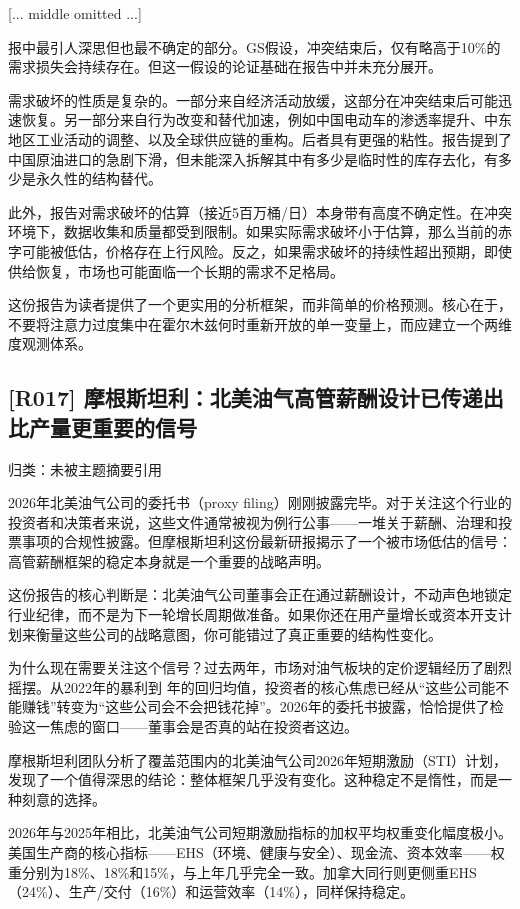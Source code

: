 \documentclass[11pt]{ctexart}
\begin{document}
[... middle omitted ...]

报中最引人深思但也最不确定的部分。GS假设，冲突结束后，仅有略高于10\%的需求损失会持续存在。但这一假设的论证基础在报告中并未充分展开。

需求破坏的性质是复杂的。一部分来自经济活动放缓，这部分在冲突结束后可能迅速恢复。另一部分来自行为改变和替代加速，例如中国电动车的渗透率提升、中东地区工业活动的调整、以及全球供应链的重构。后者具有更强的粘性。报告提到了中国原油进口的急剧下滑，但未能深入拆解其中有多少是临时性的库存去化，有多少是永久性的结构替代。

此外，报告对需求破坏的估算（接近5百万桶/日）本身带有高度不确定性。在冲突环境下，数据收集和质量都受到限制。如果实际需求破坏小于估算，那么当前的赤字可能被低估，价格存在上行风险。反之，如果需求破坏的持续性超出预期，即使供给恢复，市场也可能面临一个长期的需求不足格局。

这份报告为读者提供了一个更实用的分析框架，而非简单的价格预测。核心在于，不要将注意力过度集中在霍尔木兹何时重新开放的单一变量上，而应建立一个两维度观测体系。

\subsection{[R017] 摩根斯坦利：北美油气高管薪酬设计已传递出比产量更重要的信号}
{\small\color{refgray}归类：未被主题摘要引用}

2026年北美油气公司的委托书（proxy filing）刚刚披露完毕。对于关注这个行业的投资者和决策者来说，这些文件通常被视为例行公事——一堆关于薪酬、治理和投票事项的合规性披露。但摩根斯坦利这份最新研报揭示了一个被市场低估的信号：高管薪酬框架的稳定本身就是一个重要的战略声明。

这份报告的核心判断是：北美油气公司董事会正在通过薪酬设计，不动声色地锁定行业纪律，而不是为下一轮增长周期做准备。如果你还在用产量增长或资本开支计划来衡量这些公司的战略意图，你可能错过了真正重要的结构性变化。

为什么现在需要关注这个信号？过去两年，市场对油气板块的定价逻辑经历了剧烈摇摆。从2022年的暴利到 年的回归均值，投资者的核心焦虑已经从“这些公司能不能赚钱”转变为“这些公司会不会把钱花掉”。2026年的委托书披露，恰恰提供了检验这一焦虑的窗口——董事会是否真的站在投资者这边。

摩根斯坦利团队分析了覆盖范围内的北美油气公司2026年短期激励（STI）计划，发现了一个值得深思的结论：整体框架几乎没有变化。这种稳定不是惰性，而是一种刻意的选择。

2026年与2025年相比，北美油气公司短期激励指标的加权平均权重变化幅度极小。美国生产商的核心指标——EHS（环境、健康与安全）、现金流、资本效率——权重分别为18\%、18\%和15\%，与上年几乎完全一致。加拿大同行则更侧重EHS（24\%）、生产/交付（16\%）和运营效率（14\%），同样保持稳定。
\end{document}
